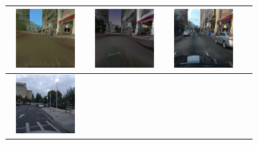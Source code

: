 \documentclass{VUMIFPSbakalaurinis}
\begin{document}
\begin{table}[H]
{\begin{tabular}{|c|c|c|c|}
            \includegraphics[width=100,height=85]{img/pvz/6_cycle_v2} & \includegraphics[width=100,height=85]{img/pvz/6_cut_v2} & \includegraphics[width=100,height=85]{img/pvz/6_mspc_v2}
            \\
            \hline
            \includegraphics[width=100,height=85]{img/pvz/7_real} & 

\end{tabular}}
\end{table}
\end{document}
